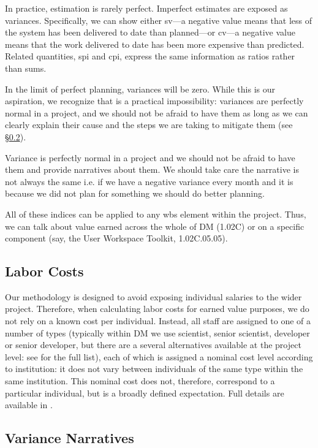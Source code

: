 In practice, estimation is rarely perfect.
Imperfect estimates are exposed as variances.
Specifically, we can show either \gls{sv}---a negative value means that less
of the system has been delivered to date than planned---or \gls{cv}---a negative value means that the work delivered to date has been more expensive than predicted.
Related quantities, \gls{spi} and \gls{cpi}, express the same information as ratios rather than sums.

In the limit of perfect planning, variances will be zero.
While this is our aspiration, we recognize that is a practical impossibility: variances are perfectly normal in a project, and we should not be afraid to have them as long as we can clearly explain their cause and the steps we are taking to mitigate them (see \S\ref{sec:variance-narrative}).

Variance is perfectly normal in a project and we should not be afraid to have them and provide narratives about them. We should take care the narrative is not always the same i.e. if we have a negative variance every month and it is because we did not plan for something we should do better planning.

All of these indices can be applied to any \gls{wbs} \gls{element} within the project.
Thus, we can talk about value earned across the whole of DM (1.02C) or on a specific component (say, the User Workspace Toolkit, 1.02C.05.05).

\subsection{Labor Costs}
\label{sec:labor-costs}

Our methodology is designed to avoid exposing individual salaries to the wider project.
Therefore, when calculating labor costs for earned value purposes, we do not rely on a known cost per individual.
Instead, all staff are assigned to one of a number of types (typically within DM we use scientist, senior scientist, developer or senior developer, but there are a several alternatives available at the project level: see  for the full list), each of which is assigned a nominal cost level according to institution: it does not vary between individuals of the same type within the same institution.
This nominal cost does not, therefore, correspond to a particular individual, but is a broadly defined expectation.
Full details are available in .

\subsection{Variance Narratives}
\label{sec:variance-narrative}


